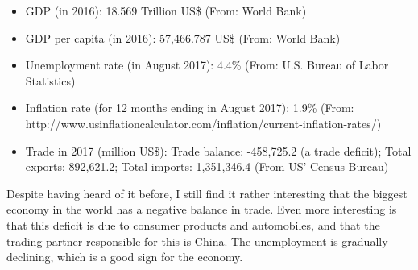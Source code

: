 \documentclass[12pt]{article}
\begin{document}
\begin{itemize}
	\item{GDP (in 2016): 18.569 Trillion US\$ (From: World Bank)}
	\item{GDP per capita (in 2016): 57,466.787 US\$ (From: World Bank)}
	\item{Unemployment rate (in August 2017): 4.4\% (From: U.S. Bureau of Labor Statistics)}
	\item{Inflation rate (for 12 months ending in August 2017): 1.9\% (From: http://www.usinflationcalculator.com/inflation/current-inflation-rates/)}
	\item{Trade in 2017 (million US\$): Trade balance: -458,725.2 (a trade deficit); Total exports: 892,621.2; Total imports: 1,351,346.4 (From US' Census Bureau)}
\end{itemize}

Despite having heard of it before, I still find it rather interesting that the biggest economy in the world has a negative balance in trade. Even more interesting is that this deficit is due to consumer products and automobiles, and that the trading partner responsible for this is China. The unemployment is gradually declining, which is a good sign for the economy.


\newpage
\printbibliography 
\end{document}
